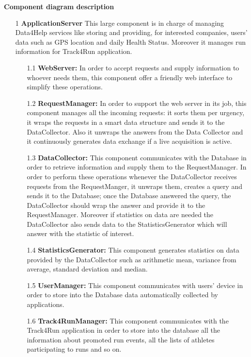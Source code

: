 {\large \textbf{Component diagram description}}
\begin{enumerate}
\item [1] \textbf{ApplicationServer} 
This large component is in charge of managing Data4Help services like storing and providing, for interested companies, users’ data such as GPS location and daily Health Status. Moreover it manages run information for Track4Run application.

	\begin{enumerate}
	\item [1.1] \textbf{WebServer:} In order to accept requests and supply information to whoever needs them, this component offer a friendly web interface to simplify these operations.
		
	\item [1.2] \textbf{RequestManager:} In order to support the web server in its job, this component manages all the incoming requests: it sorts them per urgency, it wraps the requests in a smart data structure and sends it to the DataCollector. Also it unwraps the answers from the Data Collector and it continuously generates data exchange if a live acquisition is active.
		
	\item [1.3] \textbf{DataCollector: } This component communicates with the Database in order to retrieve information and supply them to the RequestManager. In order to perform these operations whenever the DataCollector receives requests from the RequestManger, it unwraps them, creates a query and sends it to the Database; once the Database answered the query, the DataCollector should wrap the answer and provide it to the RequestManager. Moreover if statistics on data are needed the DataCollector also sends data to the StatisticsGenerator which will answer with the statistic of interest.
		
	\item [1.4] \textbf{StatisticsGenerator: } This component generates statistics on data provided by the DataCollector such as arithmetic mean, variance from average, standard deviation and median.

	\item [1.5] \textbf{UserManager: } This component communicates with users' device in order to store into the Database data automatically collected by applications.

	\item [1.6] \textbf{Track4RunManager: } This component communicates with the Track4Run application in order to store into the database all the information about promoted run events, all the lists of athletes participating to runs and so on.
	

\end{enumerate}
\end{enumerate}

